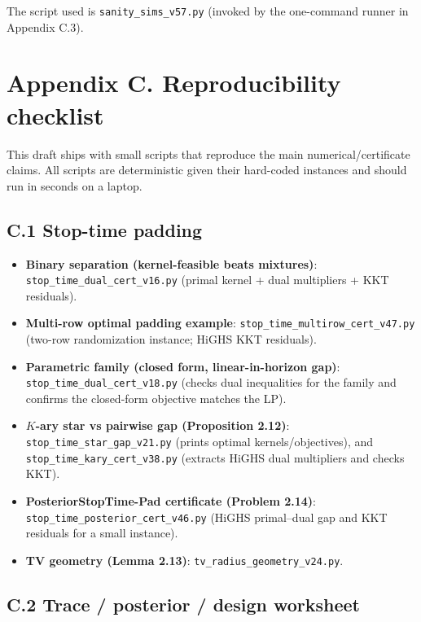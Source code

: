 \documentclass[11pt]{article}
\providecommand{\tightlist}{%
  \setlength{\itemsep}{0pt}\setlength{\parskip}{0pt}}
\begin{document}
The script used is \texttt{sanity\_sims\_v57.py} (invoked by the
one-command runner in Appendix C.3).

\hypertarget{appendix-c.-reproducibility-checklist}{%
\section{Appendix C. Reproducibility
checklist}\label{appendix-c.-reproducibility-checklist}}

This draft ships with small scripts that reproduce the main
numerical/certificate claims. All scripts are deterministic given their
hard-coded instances and should run in seconds on a laptop.

\hypertarget{c.1-stop-time-padding}{%
\subsection{C.1 Stop-time padding}\label{c.1-stop-time-padding}}

\begin{itemize}
\tightlist
\item
  \textbf{Binary separation (kernel-feasible beats mixtures)}:
  \texttt{stop\_time\_dual\_cert\_v16.py} (primal kernel + dual
  multipliers + KKT residuals).
\item
  \textbf{Multi-row optimal padding example}:
  \texttt{stop\_time\_multirow\_cert\_v47.py} (two-row randomization
  instance; HiGHS KKT residuals).
\item
  \textbf{Parametric family (closed form, linear-in-horizon gap)}:
  \texttt{stop\_time\_dual\_cert\_v18.py} (checks dual inequalities for
  the family and confirms the closed-form objective matches the LP).
\item
  \textbf{\(K\)-ary star vs pairwise gap (Proposition 2.12)}:
  \texttt{stop\_time\_star\_gap\_v21.py} (prints optimal
  kernels/objectives), and \texttt{stop\_time\_kary\_cert\_v38.py}
  (extracts HiGHS dual multipliers and checks KKT).
\item
  \textbf{PosteriorStopTime-Pad certificate (Problem 2.14)}:
  \texttt{stop\_time\_posterior\_cert\_v46.py} (HiGHS primal--dual gap
  and KKT residuals for a small instance).
\item
  \textbf{TV geometry (Lemma 2.13)}:
  \texttt{tv\_radius\_geometry\_v24.py}.
\end{itemize}

\hypertarget{c.2-trace-posterior-design-worksheet}{%
\subsection{C.2 Trace / posterior / design
worksheet}\label{c.2-trace-posterior-design-worksheet}}
\end{document}
